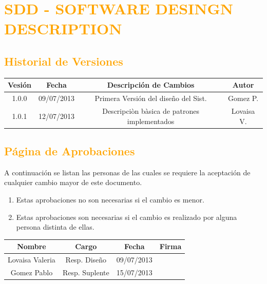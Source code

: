 \chapter{\textcolor{orange}{SDD - SOFTWARE DESINGN DESCRIPTION}}
\newpage
\section{\textcolor{orange}{Historial de Versiones}}
\begin{table}[!h]
\begin{center}
\begin{tabular}{|c|c|c|c|}
\hline
\rowcolor[RGB]{255,127,0} Vesión & Fecha & Descripción de Cambios & Autor\\
\hline
1.0.0 & 09/07/2013 & Primera Versión del diseño del Sist. & Gomez P.\\
\hline
1.0.1 & 12/07/2013 & Descripciòn bàsica de patrones implementados & Lovaisa V.\\
\hline
\end{tabular}
\end{center}
\end{table}
\newpage

\section{\textcolor{orange}{Página de Aprobaciones}}
A continuación se listan las personas de las cuales se requiere la aceptación de
cualquier cambio mayor de este documento.
\begin{enumerate}
  \item Estas aprobaciones no son necesarias si el cambio es menor.
  \item Estas aprobaciones son necesarias si el cambio es realizado por alguna
  persona distinta de ellas.
\end{enumerate}
\begin{table}[!h]
\begin{center}
\begin{tabular}{|c|c|c|c|}
\hline
\rowcolor[RGB]{255,127,0} Nombre & Cargo & Fecha & Firma\\
\hline
Lovaisa Valeria & Resp. Diseño & 09/07/2013 & \\
\hline
Gomez Pablo & Resp. Suplente & 15/07/2013 & \\
\hline
\end{tabular}
\end{center}
\end{table}

